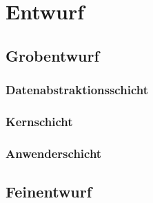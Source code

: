 \section{Entwurf}

\subsection{Grobentwurf}

\subsubsection{Datenabstraktionsschicht}

\subsubsection{Kernschicht}
\label{kernschicht}

\subsubsection{Anwenderschicht}


\subsection{Feinentwurf}
